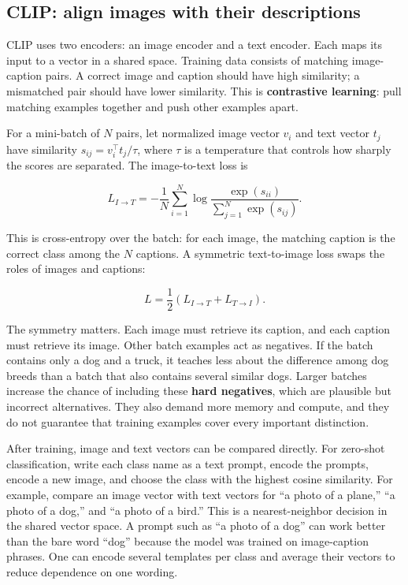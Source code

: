 \subsection{CLIP: align images with their descriptions}\label{04-visual-computing-ii-ch031-clip-align-images-with-their-descriptions}

\hypertarget{04-visual-computing-ii-ch031-clip-align-images-with-their-descriptions}{}

CLIP uses two encoders: an image encoder and a text encoder. Each maps its input to a vector in a shared space. Training data consists of matching image-caption pairs. A correct image and caption should have high similarity; a mismatched pair should have lower similarity. This is \textbf{contrastive learning}: pull matching examples together and push other examples apart.

For a mini-batch of \(N\) pairs, let normalized image vector \(v_i\) and text vector \(t_j\) have similarity \(s_{ij}=v_i^\top t_j/\tau\), where \(\tau\) is a temperature that controls how sharply the scores are separated. The image-to-text loss is

\[
L_{I\to T}=-\frac{1}{N}\sum_{i=1}^{N}\log\frac{\exp(s_{ii})}{\sum_{j=1}^{N}\exp(s_{ij})}.
\]

This is cross-entropy over the batch: for each image, the matching caption is the correct class among the \(N\) captions. A symmetric text-to-image loss swaps the roles of images and captions:

\[
L=\frac{1}{2}(L_{I\to T}+L_{T\to I}).
\]

The symmetry matters. Each image must retrieve its caption, and each caption must retrieve its image. Other batch examples act as negatives. If the batch contains only a dog and a truck, it teaches less about the difference among dog breeds than a batch that also contains several similar dogs. Larger batches increase the chance of including these \textbf{hard negatives}, which are plausible but incorrect alternatives. They also demand more memory and compute, and they do not guarantee that training examples cover every important distinction.

After training, image and text vectors can be compared directly. For zero-shot classification, write each class name as a text prompt, encode the prompts, encode a new image, and choose the class with the highest cosine similarity. For example, compare an image vector with text vectors for ``a photo of a plane,'' ``a photo of a dog,'' and ``a photo of a bird.'' This is a nearest-neighbor decision in the shared vector space. A prompt such as ``a photo of a dog'' can work better than the bare word ``dog'' because the model was trained on image-caption phrases. One can encode several templates per class and average their vectors to reduce dependence on one wording.

